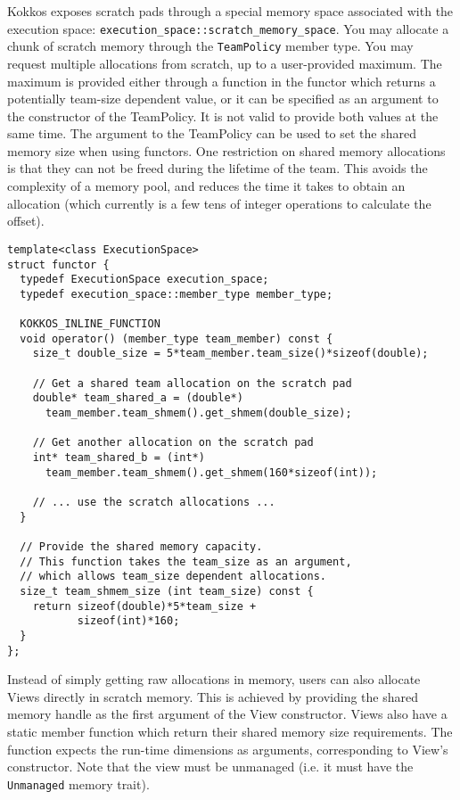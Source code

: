 Kokkos exposes scratch pads through a special memory space associated with the execution space:
\lstinline|execution_space::scratch_memory_space|.
You may allocate a chunk of scratch memory through the \lstinline|TeamPolicy| member type.
You may request multiple allocations from scratch, up to a user-provided maximum. 
The maximum is provided either through a function in the functor which returns a potentially team-size dependent value, 
or it can be specified as an argument to the constructor of the TeamPolicy. 
It is not valid to provide both values at the same time. 
The argument to the TeamPolicy can be used to set the shared memory size when using functors. 
One restriction on shared memory allocations is that they can not be freed during the lifetime of the team. 
This avoids the complexity of a memory pool,
and reduces the time it takes to obtain an allocation
(which currently is a few tens of integer operations to calculate the offset). 

\begin{lstlisting}
template<class ExecutionSpace>
struct functor {
  typedef ExecutionSpace execution_space;
  typedef execution_space::member_type member_type; 

  KOKKOS_INLINE_FUNCTION
  void operator() (member_type team_member) const {
    size_t double_size = 5*team_member.team_size()*sizeof(double);

    // Get a shared team allocation on the scratch pad
    double* team_shared_a = (double*)
      team_member.team_shmem().get_shmem(double_size);

    // Get another allocation on the scratch pad
    int* team_shared_b = (int*)
      team_member.team_shmem().get_shmem(160*sizeof(int));

    // ... use the scratch allocations ...
  }

  // Provide the shared memory capacity.
  // This function takes the team_size as an argument,
  // which allows team_size dependent allocations.
  size_t team_shmem_size (int team_size) const {
    return sizeof(double)*5*team_size +
           sizeof(int)*160;
  }
};
\end{lstlisting}

Instead of simply getting raw allocations in memory, users can also allocate Views directly in scratch memory. 
This is achieved by providing the shared memory handle as the first argument of the View constructor.
Views also have a static member function which return their shared memory size requirements. 
The function expects the run-time dimensions as arguments, corresponding to View's constructor. 
Note that the view must be unmanaged (i.e. it must have the \lstinline|Unmanaged| memory trait).

